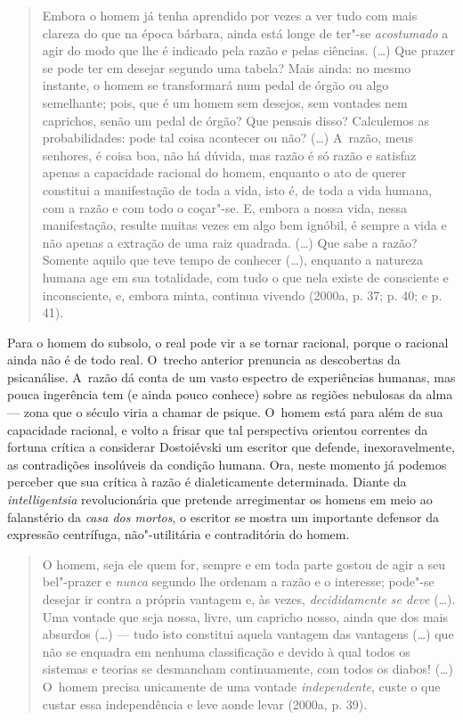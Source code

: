 \begin{quote}
Embora o homem já tenha aprendido por vezes a ver tudo com mais clareza
do que na época bárbara, ainda está longe de ter"-se \emph{acostumado} a
agir do modo que lhe é indicado pela razão e pelas ciências. (\ldots) Que
prazer se pode ter em desejar segundo uma tabela? Mais ainda: no mesmo
instante, o homem se transformará num pedal de órgão ou algo semelhante;
pois, que é um homem sem desejos, sem vontades nem caprichos, senão um
pedal de órgão? Que pensais disso? Calculemos as probabilidades: pode
tal coisa acontecer ou não? (\ldots) A~razão, meus senhores, é coisa boa,
não há dúvida, mas razão é só razão e satisfaz apenas a capacidade
racional do homem, enquanto o ato de querer constitui a manifestação de
toda a vida, isto é, de toda a vida humana, com a razão e com todo o
coçar"-se. E, embora a nossa vida, nessa manifestação, resulte muitas
vezes em algo bem ignóbil, é sempre a vida e não apenas a extração de
uma raiz quadrada. (\ldots) Que sabe a razão? Somente aquilo que teve tempo
de conhecer (\ldots), enquanto a natureza humana age em sua totalidade, com
tudo o que nela existe de consciente e inconsciente, e, embora minta,
continua vivendo (2000a, p. 37; p. 40; e p. 41).
\end{quote}

Para o homem do subsolo, o real pode vir a se tornar racional, porque o
racional ainda não é de todo real. O~trecho anterior prenuncia as
descobertas da psicanálise. A~razão dá conta de um vasto espectro de
experiências humanas, mas pouca ingerência tem (e ainda pouco conhece)
sobre as regiões nebulosas da alma --- zona que o século  viria a
chamar de psique. O~homem está para além de sua capacidade racional, e
volto a frisar que tal perspectiva orientou correntes da fortuna crítica
a considerar Dostoiévski um escritor que defende, inexoravelmente, as
contradições insolúveis da condição humana. Ora, neste momento já
podemos perceber que sua crítica à razão é dialeticamente determinada.
Diante da \emph{intelligentsia} revolucionária que pretende arregimentar
os homens em meio ao falanstério da \emph{casa dos mortos}, o escritor
se mostra um importante defensor da expressão centrífuga, não"-utilitária
e contraditória do homem.

\begin{quote}
O homem, seja ele quem for, sempre e em toda parte gostou de agir a seu
bel"-prazer e \emph{nunca} segundo lhe ordenam a razão e o interesse;
pode"-se desejar ir contra a própria vantagem e, às vezes,
\emph{decididamente se deve} (\ldots). Uma vontade que seja nossa, livre,
um capricho nosso, ainda que dos mais absurdos (\ldots) --- tudo isto
constitui aquela vantagem das vantagens (\ldots) que não se enquadra em
nenhuma classificação e devido à qual todos os sistemas e teorias se
desmancham continuamente, com todos os diabos! (\ldots) O~homem precisa
unicamente de uma vontade \emph{independente}, custe o que custar essa
independência e leve aonde levar (2000a, p. 39).
\end{quote}

